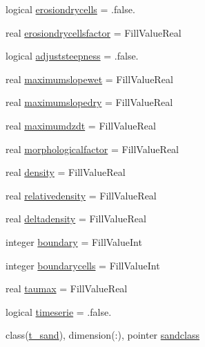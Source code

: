 \begin{DoxyCompactItemize}
\item 
logical \mbox{\hyperlink{structmodulesediment_1_1t__sediment_ae4b9045edeb08b352540626d61c07d0a}{erosiondrycells}} = .false.
\item 
real \mbox{\hyperlink{structmodulesediment_1_1t__sediment_aa49bf189ed85aff8a6e739b094b1e55b}{erosiondrycellsfactor}} = Fill\+Value\+Real
\item 
logical \mbox{\hyperlink{structmodulesediment_1_1t__sediment_ab9347b7061103cbfcc29d2f2623ba442}{adjuststeepness}} = .false.
\item 
real \mbox{\hyperlink{structmodulesediment_1_1t__sediment_a9838273d10abb3f255c5667f833fea47}{maximumslopewet}} = Fill\+Value\+Real
\item 
real \mbox{\hyperlink{structmodulesediment_1_1t__sediment_a084602f571a4acf6ab3a920236c2126e}{maximumslopedry}} = Fill\+Value\+Real
\item 
real \mbox{\hyperlink{structmodulesediment_1_1t__sediment_a1eb259a2d614318f83c0309a76d27949}{maximumdzdt}} = Fill\+Value\+Real
\item 
real \mbox{\hyperlink{structmodulesediment_1_1t__sediment_acfac3897aa98b33f8f7aa0a8d0435ed2}{morphologicalfactor}} = Fill\+Value\+Real
\item 
real \mbox{\hyperlink{structmodulesediment_1_1t__sediment_ad7f0677bda7ff2118429af8ce91801dc}{density}} = Fill\+Value\+Real
\item 
real \mbox{\hyperlink{structmodulesediment_1_1t__sediment_a5842d4bb8870b5a3d15add5a33044d38}{relativedensity}} = Fill\+Value\+Real
\item 
real \mbox{\hyperlink{structmodulesediment_1_1t__sediment_a8aaa3fc92be426c0da3be58c974ea488}{deltadensity}} = Fill\+Value\+Real
\item 
integer \mbox{\hyperlink{structmodulesediment_1_1t__sediment_aae7091a2e99d5427b623874a9f1351cd}{boundary}} = Fill\+Value\+Int
\item 
integer \mbox{\hyperlink{structmodulesediment_1_1t__sediment_af9fc96d3e994b3b25a6e0493664ef236}{boundarycells}} = Fill\+Value\+Int
\item 
real \mbox{\hyperlink{structmodulesediment_1_1t__sediment_a14fb230a02f1c89e2d5f739d6113932f}{taumax}} = Fill\+Value\+Real
\item 
logical \mbox{\hyperlink{structmodulesediment_1_1t__sediment_a1775e663b0638c3258e00021b8363cb2}{timeserie}} = .false.
\item 
class(\mbox{\hyperlink{structmodulesediment_1_1t__sand}{t\+\_\+sand}}), dimension(\+:), pointer \mbox{\hyperlink{structmodulesediment_1_1t__sediment_a68c9008f12121a2464186f62da3918d5}{sandclass}}

\end{DoxyCompactItemize}
